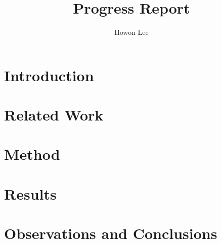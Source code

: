 \documentclass[12pt]{article}
\begin{document}
\title{Progress Report}
\author{Howon Lee}
\maketitle

\section*{Introduction}

\section*{Related Work}

\section*{Method}

\section*{Results}

\section*{Observations and Conclusions}
\end{document}
